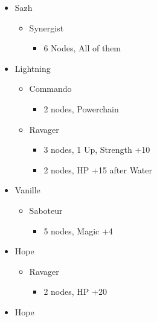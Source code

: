 \begin{paracol}{2}
\begin{menu}
\begin{itemize}
			\crystarium
			\begin{itemize}
				\item Sazh
				      \begin{itemize}
					      \item Synergist
					            \begin{itemize}
						            \item 6 Nodes, All of them
					            \end{itemize}
				      \end{itemize}
				\item Lightning
				      \begin{itemize}
					      \item Commando
					            \begin{itemize}
						            \item 2 nodes, Powerchain
					            \end{itemize}
					      \item Ravager
					            \begin{itemize}
						            \item 3 nodes, 1 Up, Strength +10
						            \item 2 nodes, HP +15 after Water
					            \end{itemize}
				      \end{itemize}
				\item Vanille
				      \begin{itemize}
					      \item Saboteur
					            \begin{itemize}
						            \item 5 nodes, Magic +4
					            \end{itemize}
				      \end{itemize}
				\item Hope
				      \begin{itemize}
					      \item Ravager
					            \begin{itemize}
						            \item 2 nodes, HP +20
					            \end{itemize}
				      \end{itemize}
			\end{itemize}
			\equip
			\begin{itemize}
				\item Hope
				      \begin{itemize}

\end{itemize}
\end{itemize}
\end{itemize}
\end{menu}
\end{paracol}
